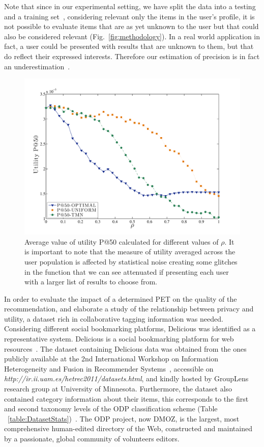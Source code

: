 Note that since in our experimental setting, we have split the data into a testing and a training set~\cite{a02,a03}, considering relevant only the items in the user's profile, it is not possible to evaluate items that are as yet unknown to the user but that could also be considered relevant (Fig.~\ref{fig:methodology}).  In a real world application in fact, a user could be presented with results that are unknown to them, but that do reflect their expressed interests. Therefore our estimation of precision is in fact an underestimation~\cite{a23}.

\begin{figure}[htb]  
\includegraphics[width=\textwidth]{figures/Fig5b.pdf}
\caption[Utility measurement P@50.]{Average value of utility P@50 calculated for different values of $\rho$. It is important to note that the measure of utility averaged across the user population is affected by statistical noise creating some glitches in the function that we can see attenuated if presenting each user with a larger list of results to choose from.
\label{fig:P50-Rho}}
\end{figure}

In order to evaluate the impact of a determined PET on the quality of the recommendation, and elaborate a study of the relationship between privacy and utility, a dataset rich in collaborative tagging information was needed.  Considering different social bookmarking platforms, Delicious was identified as a representative system. Delicious is a social bookmarking platform for web resources~\cite{delicious}. The dataset containing Delicious data was obtained from the ones publicly available at the 2nd International Workshop on Information Heterogeneity and Fusion in Recommender Systems~\cite{a21}, accessible on \emph{http://ir.ii.uam.es/hetrec2011/datasets.html}, and kindly hosted by  GroupLens research group at University of Minnesota. Furthermore, the dataset also contained category information about their items, this corresponds to the first and second taxonomy levels of the ODP classification scheme (Table ~\ref{table:DatasetStats})~\cite{a22}. The ODP project, now DMOZ, is the largest, most comprehensive human-edited directory of the Web, constructed and maintained by a passionate, global community of volunteers editors.


